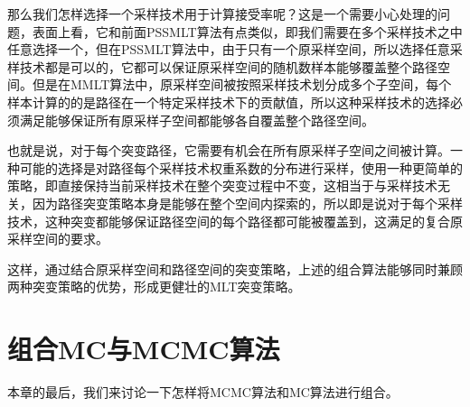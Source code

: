 那么我们怎样选择一个采样技术用于计算接受率呢？这是一个需要小心处理的问题，表面上看，它和前面PSSMLT算法有点类似，即我们需要在多个采样技术之中任意选择一个，但在PSSMLT算法中，由于只有一个原采样空间，所以选择任意采样技术都是可以的，它都可以保证原采样空间的随机数样本能够覆盖整个路径空间。但是在MMLT算法中，原采样空间被按照采样技术划分成多个子空间，每个样本计算的的是路径在一个特定采样技术下的贡献值，所以这种采样技术的选择必须满足能够保证所有原采样子空间都能够各自覆盖整个路径空间。

也就是说，对于每个突变路径，它需要有机会在所有原采样子空间之间被计算。一种可能的选择是对路径每个采样技术权重系数的分布进行采样，\cite{a:FusingStateSpacesforMarkovChainMonteCarloRendering}使用一种更简单的策略，即直接保持当前采样技术在整个突变过程中不变，这相当于与采样技术无关，因为路径突变策略本身是能够在整个空间内探索的，所以即是说对于每个采样技术，这种突变都能够保证路径空间的每个路径都可能被覆盖到，这满足的复合原采样空间的要求。

这样，通过结合原采样空间和路径空间的突变策略，上述的组合算法能够同时兼顾两种突变策略的优势，形成更健壮的MLT突变策略。












\section{组合MC与MCMC算法}\label{sec:mlt-combine}
本章的最后，我们来讨论一下怎样将MCMC算法和MC算法进行组合。


